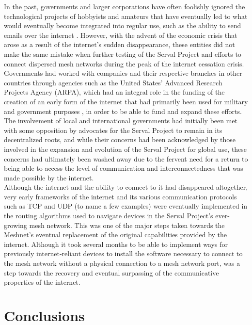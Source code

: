 \documentclass{article}
\theoremstyle{theorem}
\theoremstyle{definition}
\theoremstyle{remark}
\begin{document}
	In the past, governments and larger corporations have often foolishly ignored the technological projects of hobbyists and amateurs that have eventually led to what would eventually become integrated into regular use, such as the ability to send emails over the internet \cite{Ptd}. However, with the advent of the economic crisis that arose as a result of the internet’s sudden disappearance, these entities did not make the same mistake when further testing of the Serval Project and efforts to connect dispersed mesh networks during the peak of the internet cessation crisis. Governments had worked with companies and their respective branches in other countries through agencies such as the United States’ Advanced Research Projects Agency (ARPA), which had an integral role in the funding of the creation of an early form of the internet that had primarily been used for military and government purposes \cite{Hsf}, in order to be able to fund and expand these efforts. The involvement of local and international governments had initially been met with some opposition by advocates for the Serval Project to remain in its decentralized roots, and while their concerns had been acknowledged by those involved in the expansion and evolution of the Serval Project for global use, these concerns had ultimately been washed away due to the fervent need for a return to being able to access the level of communication and interconnectedness that was made possible by the internet. \\

	Although the internet and the ability to connect to it had disappeared altogether, very early frameworks of the internet and its various communication protocols such as TCP and UDP (to name a few examples) \cite{Hsf} were eventually implemented in the routing algorithms used to navigate devices in the Serval Project’s ever-growing mesh network. This was one of the major steps taken towards the Meshnet’s eventual replacement of the original capabilities provided by the internet. Although it took several months to be able to implement ways for previously internet-reliant devices to install the software necessary to connect to the mesh network without a physical connection to a mesh network port, was a step towards the recovery and eventual surpassing of the communicative properties of the internet. \\

\section{Conclusions}\label{conclusions}
\end{document}
